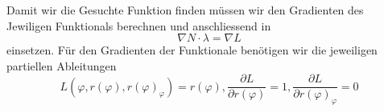 Damit wir die Gesuchte Funktion finden müssen wir den Gradienten des Jewiligen Funktionals berechnen und anschliessend in
\begin{equation*}
	\nabla N \cdot \lambda = \nabla L
\end{equation*}
einsetzen.
Für den Gradienten der Funktionale benötigen wir die jeweiligen partiellen Ableitungen
\begin{equation*}
	L(\varphi ,r(\varphi),r(\varphi)_\varphi) = r(\varphi),
	\frac{\partial L}{\partial r(\varphi)} = 1,
	\frac{\partial L}{\partial r(\varphi)_\varphi} = 0
\end{equation*}









